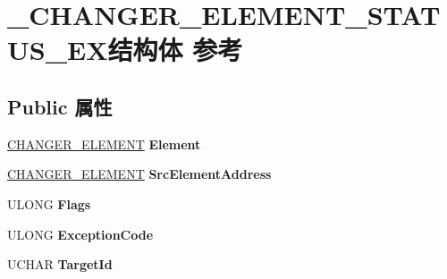 \hypertarget{struct___c_h_a_n_g_e_r___e_l_e_m_e_n_t___s_t_a_t_u_s___e_x}{}\section{\+\_\+\+C\+H\+A\+N\+G\+E\+R\+\_\+\+E\+L\+E\+M\+E\+N\+T\+\_\+\+S\+T\+A\+T\+U\+S\+\_\+\+E\+X结构体 参考}
\label{struct___c_h_a_n_g_e_r___e_l_e_m_e_n_t___s_t_a_t_u_s___e_x}
\subsection*{Public 属性}
\begin{DoxyCompactItemize}
\item 
\mbox{\label{struct___c_h_a_n_g_e_r___e_l_e_m_e_n_t___s_t_a_t_u_s___e_x_a0fed1e5c393330c31e1378f49557b5f1}} 
\hyperlink{struct___c_h_a_n_g_e_r___e_l_e_m_e_n_t}{C\+H\+A\+N\+G\+E\+R\+\_\+\+E\+L\+E\+M\+E\+NT} {\bfseries Element}
\item 
\mbox{\label{struct___c_h_a_n_g_e_r___e_l_e_m_e_n_t___s_t_a_t_u_s___e_x_ac367eb6ab76ba8630cebd0ad37854829}} 
\hyperlink{struct___c_h_a_n_g_e_r___e_l_e_m_e_n_t}{C\+H\+A\+N\+G\+E\+R\+\_\+\+E\+L\+E\+M\+E\+NT} {\bfseries Src\+Element\+Address}
\item 
\mbox{\label{struct___c_h_a_n_g_e_r___e_l_e_m_e_n_t___s_t_a_t_u_s___e_x_abf86c49f4ecce373a2716c33a7dd34c3}} 
U\+L\+O\+NG {\bfseries Flags}
\item 
\mbox{\label{struct___c_h_a_n_g_e_r___e_l_e_m_e_n_t___s_t_a_t_u_s___e_x_ad1240ae9d379ec648f772b776ad09e56}} 
U\+L\+O\+NG {\bfseries Exception\+Code}
\item 
\mbox{\label{struct___c_h_a_n_g_e_r___e_l_e_m_e_n_t___s_t_a_t_u_s___e_x_a17aa20dd5b508c5f73e636fbee8ae7fe}} 
U\+C\+H\+AR {\bfseries Target\+Id}
\item 
\mbox{\label{struct___c_h_a_n_g_e_r___e_l_e_m_e_n_t___s_t_a_t_u_s___e_x_a9ebdc3a98a6abacf9b94f609c8998e42}} 

\end{DoxyCompactItemize}
